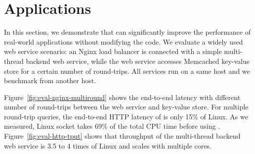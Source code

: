 \section{Applications}
\label{sec:application}

In this section, we demonstrate that \sys{} can significantly improve the performance of real-world applications without modifying the code.
We evaluate a widely used web service scenario: an Nginx load balancer is connected with a simple multi-thread backend web service, while the web service accesses Memcached key-value store for a certain number of round-trips. All services run on a same host and we benchmark from another host.

Figure~\ref{fig:eval-nginx-multiround} shows the end-to-end latency with different number of round-trips between the web service and key-value store.
For multiple round-trip queries, the end-to-end HTTP latency of \sys{} is only 15\% of Linux.
As we measured, Linux socket takes 69\% of the total CPU time before using \libipc.
Figure~\ref{fig:eval-http-tput} shows that \sys{} throughput of the multi-thread backend web service is 3.5 to 4 times of Linux and scales with multiple cores.











